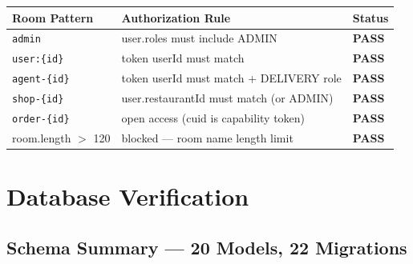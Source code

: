 \documentclass[11pt,a4paper]{article}
\newcommand{\PASS}{\colorbox{successgreen!20}{\color{successgreen}\bfseries\small PASS}}
\begin{document}
\begin{tabularx}{\textwidth}{@{}lXl@{}}
\toprule
\rowcolor{navyblue}\color{white}\bfseries Room Pattern & \color{white}\bfseries Authorization Rule & \color{white}\bfseries Status \\
\midrule
\texttt{admin}          & user.roles must include ADMIN & \PASS \\
\rowcolor{rowalt}
\texttt{user:\{id\}}    & token userId must match & \PASS \\
\texttt{agent-\{id\}}   & token userId must match + DELIVERY role & \PASS \\
\rowcolor{rowalt}
\texttt{shop-\{id\}}    & user.restaurantId must match (or ADMIN) & \PASS \\
\texttt{order-\{id\}}   & open access (cuid is capability token) & \PASS \\
\rowcolor{rowalt}
room.length $>$ 120     & blocked — room name length limit & \PASS \\
\bottomrule
\end{tabularx}

\section{Database Verification}

\subsection{Schema Summary — 20 Models, 22 Migrations}
\end{document}
